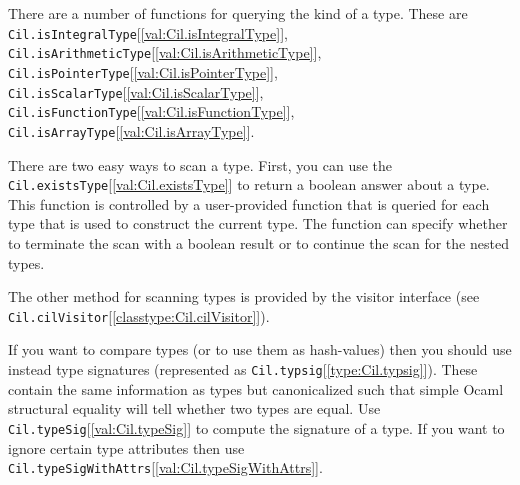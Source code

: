 \documentclass[11pt]{article}
\begin{document}
There are a number of functions for querying the kind of a type. These are
 {\tt{Cil.isIntegralType}}[\ref{val:Cil.isIntegralType}], 
 {\tt{Cil.isArithmeticType}}[\ref{val:Cil.isArithmeticType}], 
 {\tt{Cil.isPointerType}}[\ref{val:Cil.isPointerType}], 
 {\tt{Cil.isScalarType}}[\ref{val:Cil.isScalarType}], 
 {\tt{Cil.isFunctionType}}[\ref{val:Cil.isFunctionType}], 
 {\tt{Cil.isArrayType}}[\ref{val:Cil.isArrayType}]. 


 There are two easy ways to scan a type. First, you can use the
{\tt{Cil.existsType}}[\ref{val:Cil.existsType}] to return a boolean answer about a type. This function
is controlled by a user-provided function that is queried for each type that is
used to construct the current type. The function can specify whether to
terminate the scan with a boolean result or to continue the scan for the
nested types. 


 The other method for scanning types is provided by the visitor interface (see
 {\tt{Cil.cilVisitor}}[\ref{classtype:Cil.cilVisitor}]).


 If you want to compare types (or to use them as hash-values) then you should
use instead type signatures (represented as {\tt{Cil.typsig}}[\ref{type:Cil.typsig}]). These
contain the same information as types but canonicalized such that simple Ocaml
structural equality will tell whether two types are equal. Use
{\tt{Cil.typeSig}}[\ref{val:Cil.typeSig}] to compute the signature of a type. If you want to ignore
certain type attributes then use {\tt{Cil.typeSigWithAttrs}}[\ref{val:Cil.typeSigWithAttrs}].
\end{document}
